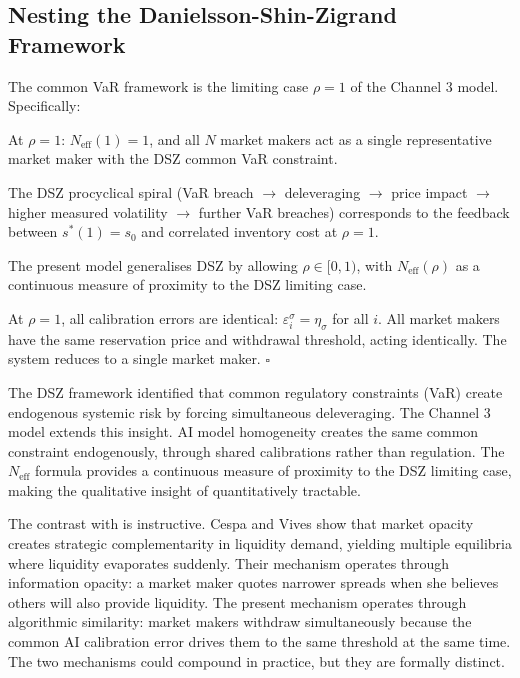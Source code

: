 \subsection{Nesting the Danielsson-Shin-Zigrand Framework}

\begin{proposition}\label{prop:dsz}
  The \citet{danielsson2012} common VaR framework is the limiting case $\rho = 1$ of the Channel 3 model. Specifically:

   At $\rho = 1$: $N_{\text{eff}}(1) = 1$, and all $N$ market makers act as a single representative market maker with the DSZ common VaR constraint.

   The DSZ procyclical spiral (VaR breach $\to$ deleveraging $\to$ price impact $\to$ higher measured volatility $\to$ further VaR breaches) corresponds to the feedback between $s^*(1) = s_0$ and correlated inventory cost at $\rho = 1$.

   The present model generalises DSZ by allowing $\rho \in [0,1)$, with $N_{\text{eff}}(\rho)$ as a continuous measure of proximity to the DSZ limiting case.

   At $\rho = 1$, all calibration errors are identical: $\varepsilon_i^\sigma = \eta_\sigma$ for all $i$. All market makers have the same reservation price and withdrawal threshold, acting identically. The system reduces to a single market maker. $\square$
\end{proposition}

The DSZ framework identified that common regulatory constraints (VaR) create endogenous systemic risk by forcing simultaneous deleveraging. The Channel 3 model extends this insight. AI model homogeneity creates the same common constraint endogenously, through shared calibrations rather than regulation. The $N_{\text{eff}}$ formula provides a continuous measure of proximity to the DSZ limiting case, making the qualitative insight of \citet{danielsson2012} quantitatively tractable.

The contrast with \citet{cespa2025} is instructive. Cespa and Vives show that market opacity creates strategic complementarity in liquidity demand, yielding multiple equilibria where liquidity evaporates suddenly. Their mechanism operates through information opacity: a market maker quotes narrower spreads when she believes others will also provide liquidity. The present mechanism operates through algorithmic similarity: market makers withdraw simultaneously because the common AI calibration error drives them to the same threshold at the same time. The two mechanisms could compound in practice, but they are formally distinct.

